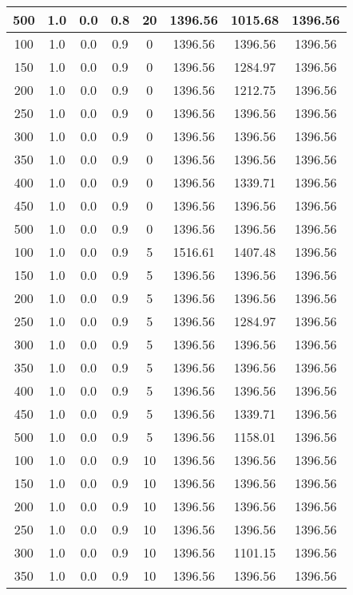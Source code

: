 \documentclass[a4paper, 12pt]{extreport}
\begin{document}
\begin{itemize}
\begin{longtable}{|c|c|c|c|c|c|c|c|}
			500 & 1.0 & 0.0 & 0.8 & 20 & 1396.56 & 1015.68 & 1396.56 \\\hline
			100 & 1.0 & 0.0 & 0.9 & 0 & 1396.56 & 1396.56 & 1396.56 \\\hline
			150 & 1.0 & 0.0 & 0.9 & 0 & 1396.56 & 1284.97 & 1396.56 \\\hline
			200 & 1.0 & 0.0 & 0.9 & 0 & 1396.56 & 1212.75 & 1396.56 \\\hline
			250 & 1.0 & 0.0 & 0.9 & 0 & 1396.56 & 1396.56 & 1396.56 \\\hline
			300 & 1.0 & 0.0 & 0.9 & 0 & 1396.56 & 1396.56 & 1396.56 \\\hline
			350 & 1.0 & 0.0 & 0.9 & 0 & 1396.56 & 1396.56 & 1396.56 \\\hline
			400 & 1.0 & 0.0 & 0.9 & 0 & 1396.56 & 1339.71 & 1396.56 \\\hline
			450 & 1.0 & 0.0 & 0.9 & 0 & 1396.56 & 1396.56 & 1396.56 \\\hline
			500 & 1.0 & 0.0 & 0.9 & 0 & 1396.56 & 1396.56 & 1396.56 \\\hline
			100 & 1.0 & 0.0 & 0.9 & 5 & 1516.61 & 1407.48 & 1396.56 \\\hline
			150 & 1.0 & 0.0 & 0.9 & 5 & 1396.56 & 1396.56 & 1396.56 \\\hline
			200 & 1.0 & 0.0 & 0.9 & 5 & 1396.56 & 1396.56 & 1396.56 \\\hline
			250 & 1.0 & 0.0 & 0.9 & 5 & 1396.56 & 1284.97 & 1396.56 \\\hline
			300 & 1.0 & 0.0 & 0.9 & 5 & 1396.56 & 1396.56 & 1396.56 \\\hline
			350 & 1.0 & 0.0 & 0.9 & 5 & 1396.56 & 1396.56 & 1396.56 \\\hline
			400 & 1.0 & 0.0 & 0.9 & 5 & 1396.56 & 1396.56 & 1396.56 \\\hline
			450 & 1.0 & 0.0 & 0.9 & 5 & 1396.56 & 1339.71 & 1396.56 \\\hline
			500 & 1.0 & 0.0 & 0.9 & 5 & 1396.56 & 1158.01 & 1396.56 \\\hline
			100 & 1.0 & 0.0 & 0.9 & 10 & 1396.56 & 1396.56 & 1396.56 \\\hline
			150 & 1.0 & 0.0 & 0.9 & 10 & 1396.56 & 1396.56 & 1396.56 \\\hline
			200 & 1.0 & 0.0 & 0.9 & 10 & 1396.56 & 1396.56 & 1396.56 \\\hline
			250 & 1.0 & 0.0 & 0.9 & 10 & 1396.56 & 1396.56 & 1396.56 \\\hline
			300 & 1.0 & 0.0 & 0.9 & 10 & 1396.56 & 1101.15 & 1396.56 \\\hline
			350 & 1.0 & 0.0 & 0.9 & 10 & 1396.56 & 1396.56 & 1396.56 \\\hline

\end{longtable}
\end{itemize}
\end{document}
